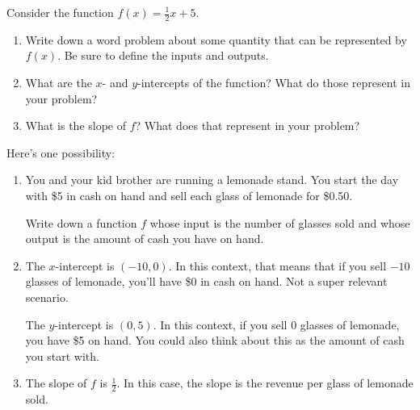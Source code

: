 \documentclass[noauthor]{ximera}
\begin{document}
\begin{problem}
Consider the function \(f(x) = \frac{1}{2}x + 5\).

\begin{enumerate}
    \item Write down a word problem about some
    quantity that can be represented by \(f(x)\).
    Be sure to define the inputs and outputs.
    \item What are the \(x\)- and \(y\)-intercepts
    of the function? What do those represent
    in your problem?
    \item What is the slope of \(f\)? What does 
    that represent in your problem?
\end{enumerate}

\begin{explanation}
Here's one possibility:

\begin{enumerate}
    \item You and your kid brother are running a lemonade stand. You start the day with \$5 in cash on hand and sell each glass of lemonade for \$0.50.
    
    Write down a function \(f\) whose input is the number of glasses sold and whose output is the amount of cash you have on hand.

    \item The \(x\)-intercept is \((-10, 0)\). In this context, that means that if you sell \(-10\) glasses of lemonade, you'll have \$0 in cash on hand. Not a super relevant scenario.
    
    The \(y\)-intercept is \((0, 5)\). In this context, if you sell 0 glasses of lemonade, you have \$5 on hand. You could also think about this as the amount of cash you start with.

    \item The slope of \(f\) is \(\frac{1}{2}\). In this case, the slope is the revenue per glass of lemonade sold.
\end{enumerate}
\end{explanation}
\end{problem}
\end{document}
